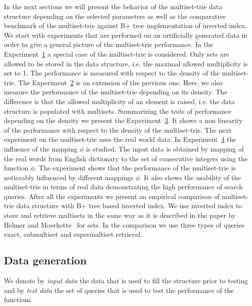 In the next sections we will present the behavior of the multiset-trie data 
structure depending on the selected parameters as well as the comparative 
benchmark of the multiset-trie against B+ tree implementation of inverted index. 
We start with experiments that are performed on an artificially generated data in 
order to give a general picture of the multiset-trie performance. In the 
Experiment~\hyperref[s:exp1]{1} a special case of the multiset-trie is considered. 
Only sets are allowed to be stored in the data structure, i.e. the maximal allowed 
multiplicity is set to 1. The performance is measured with respect to the density 
of the multiset-trie.
%
The Experiment~\hyperref[s:exp2]{2} is an extension of the previous one. Here, 
we also measure the performance of the multiset-trie depending on its density. 
The difference is that the allowed multiplicity of an element is raised, i.e. 
the data structure is populated with multisets. 
%
Summarizing the tests of performance depending on the density we present the 
Experiment~\hyperref[s:exp3]{3}. It shows a non linearity of the performance 
with respect to the density of the multiset-trie.
%
The next experiment on the multiset-trie uses the real world data. In 
Experiment~\hyperref[s:exp4]{4} the influence of the mapping $\phi$ is studied. 
The input data is obtained by mapping of the real words from English dictionary 
to the set of consecutive integers using the function $\phi.$ The experiment 
shows that the performance of the multiset-trie is noticeably influenced by 
different mappings $\phi.$ It also shows the usability of the multiset-trie in terms 
of real data demonstrating the high performance of search queries.
%
After all the experiments we present an empirical comparison of multiset-trie 
data structure with B+ tree based inverted index. We use inverted index 
to store and retrieve multisets in the same way as it is described in the paper by 
Helmer and Moerkotte~\cite{Helmer2003} for sets. In the comparison we use 
three types of queries exact, submultiset and supermultiset retrieval.

\subsection*{Data generation}
We denote by \emph{input data} the data that is used to fill the structure prior 
to testing and by \emph{test data} the set of queries that is used to test the 
performance of the functions.

